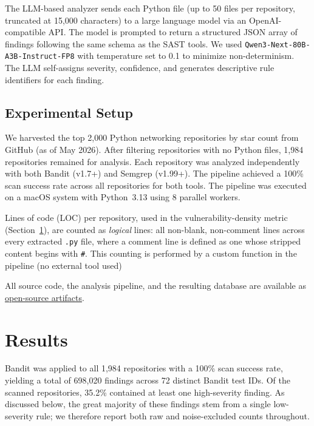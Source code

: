 \documentclass[sigconf,authordraft]{acmart}
\begin{document}
The LLM-based analyzer sends each Python file (up to 50 files per
repository, truncated at 15{,}000 characters) to a large language
model via an OpenAI-compatible API. The model is prompted to return
a structured JSON array of findings following the same schema as the
SAST tools. We used \texttt{Qwen3-Next-80B-A3B-Instruct-FP8}
with temperature set to 0.1 to minimize non-determinism. The LLM
self-assigns severity, confidence, and generates descriptive rule
identifiers for each finding.

\subsection{Experimental Setup}

We harvested the top 2{,}000 Python networking repositories by star
count from GitHub (as of May 2026). After filtering repositories with
no Python files, 1{,}984 repositories remained for analysis. Each
repository was analyzed independently with both Bandit (v1.7+) and
Semgrep (v1.99+). The pipeline achieved a 100\% scan success rate
across all repositories for both tools. The pipeline was executed on
a macOS system with Python~3.13 using 8 parallel workers.


Lines of code (LOC) per repository, used in the vulnerability-density
metric (Section~\ref{sec:results}), are counted as \emph{logical}
lines: all non-blank, non-comment lines across every extracted
\texttt{.py} file, where a comment line is defined as one whose
stripped content begins with \texttt{\#}. This counting is performed
by a custom function in the pipeline (no external tool used)

All source code, the analysis pipeline, and the resulting database
are available as
\href{https://github.com/ahmedelshaikh20/NetVulnPy}{open-source artifacts}.
\section{Results}
\label{sec:results}

Bandit was applied to all 1{,}984 repositories with a 100\% scan
success rate, yielding a total of 698{,}020 findings across 72
distinct Bandit test IDs. Of the scanned repositories, 35.2\%
contained at least one high-severity finding. As discussed below, the
great majority of these findings stem from a single low-severity rule;
we therefore report both raw and noise-excluded counts throughout.
\end{document}
